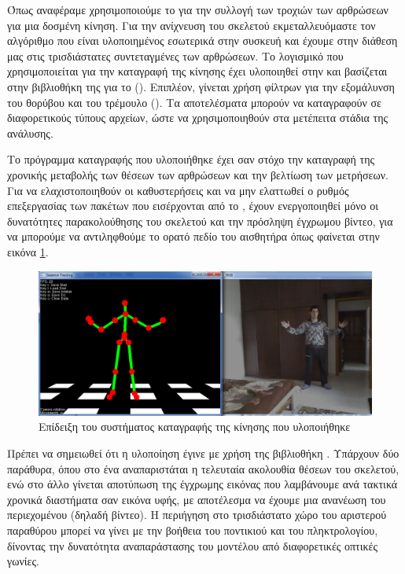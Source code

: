 Όπως αναφέραμε χρησιμοποιούμε το  για την συλλογή των τροχιών των αρθρώσεων για μια δοσμένη κίνηση. Για την ανίχνευση του σκελετού εκμεταλλευόμαστε τον αλγόριθμο που είναι υλοποιημένος εσωτερικά στην συσκευή και έχουμε στην διάθεση μας στις τρισδιάστατες συντεταγμένες των αρθρώσεων. Το λογισμικό που χρησιμοποιείται για την καταγραφή της κίνησης έχει υλοποιηθεί στην  και βασίζεται στην βιβλιοθήκη της  για το  (). Επιπλέον, γίνεται χρήση φίλτρων για την εξομάλυνση του θορύβου και του τρέμουλο (). Τα αποτελέσματα μπορούν να καταγραφούν σε διαφορετικούς τύπους αρχείων, ώστε να χρησιμοποιηθούν στα μετέπειτα στάδια της ανάλυσης.

Το πρόγραμμα καταγραφής που υλοποιήθηκε έχει σαν στόχο την καταγραφή της χρονικής μεταβολής των θέσεων των αρθρώσεων και την βελτίωση των μετρήσεων. Για να ελαχιστοποιηθούν οι καθυστερήσεις και να μην ελαττωθεί ο ρυθμός επεξεργασίας των πακέτων που εισέρχονται από το , έχουν ενεργοποιηθεί μόνο οι δυνατότητες παρακολούθησης του σκελετού και την πρόσληψη έγχρωμου βίντεο, για να μπορούμε να αντιληφθούμε το ορατό πεδίο του αισθητήρα όπως φαίνεται στην εικόνα \ref{fig:motion-capture}.

\begin{figure}[H]
    \centering
    \includegraphics[width=.9\textwidth]{methods/fig/motion-capture.png}
    \caption{Επίδειξη του συστήματος καταγραφής της κίνησης που υλοποιήθηκε}
    \label{fig:motion-capture}
\end{figure}

Πρέπει να σημειωθεί ότι η υλοποίηση έγινε με χρήση της βιβλιοθήκη . Υπάρχουν δύο παράθυρα, όπου στο ένα αναπαριστάται η τελευταία ακολουθία θέσεων του σκελετού, ενώ στο άλλο γίνεται αποτύπωση της έγχρωμης εικόνας που λαμβάνουμε ανά τακτικά χρονικά διαστήματα σαν εικόνα υφής, με αποτέλεσμα να έχουμε μια ανανέωση του περιεχομένου (δηλαδή βίντεο). Η περιήγηση στο τρισδιάστατο χώρο του αριστερού παραθύρου μπορεί να γίνει με την βοήθεια του ποντικιού και του πληκτρολογίου, δίνοντας την δυνατότητα αναπαράστασης του μοντέλου από διαφορετικές οπτικές γωνίες.

